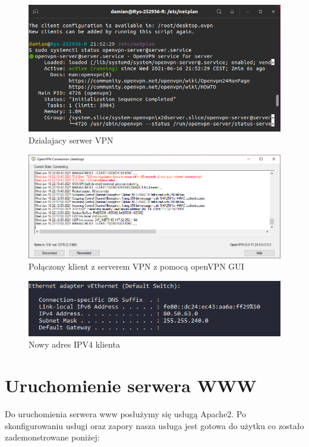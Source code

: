 \documentclass{article}
\begin{document}
\begin{figure}[H]
    \centering
    \includegraphics[scale = 0.45]{VPN/Sxo4ajG.png}  
    \caption{Dzialajacy serwer VPN }
    \label{2}
\end{figure}

\begin{figure}[H]
    \centering
    \includegraphics[totalheight = 5cm]{VPN/8AkDDvG.png}  
    \caption{Połączony klient z serverem VPN z pomocą openVPN GUI}
    \label{2}
\end{figure}

\begin{figure}[H]
    \centering
    \includegraphics[scale = 0.6]{VPN/21312321.png}  
    \caption{Nowy adres IPV4 klienta}
    \label{2}
\end{figure}
\newpage
\section{Uruchomienie serwera WWW}
Do uruchomienia serwera www posłużymy się usługą Apache2. Po skonfigurowaniu usługi oraz zapory nasza usługa jest gotowa do użytku co zostało zademonstrowane poniżej:
\end{document}
